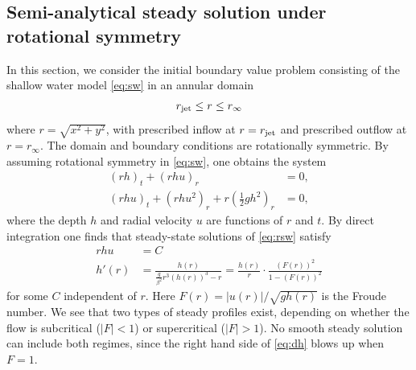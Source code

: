 \documentclass[preprint, 11pt]{article}
\begin{document}
\subsection{Semi-analytical steady solution under rotational symmetry}\label{sec:steady_chj}
In this section, we consider the initial boundary value problem consisting of the
shallow water model \eqref{eq:sw} in an annular domain
\begin{align} \label{eq:annulus}
r_\textup{jet} \le r \le r_\infty
\end{align}
where $r = \sqrt{x^2+y^2}$, with prescribed inflow at $r=r_\textup{jet}$
and prescribed outflow at $r=r_\infty$.
The domain and boundary conditions are rotationally symmetric.
By assuming rotational symmetry in \eqref{eq:sw}, one obtains the system
\begin{subequations} \label{eq:rsw}
\begin{align}
    (rh)_t + (rhu)_r &= 0, \label{mass1} \\
    (rhu)_t + (rhu^2)_r + r \left(\frac{1}{2}gh^2\right)_r &= 0, \label{mom1}
\end{align}
\end{subequations}
where the depth $h$ and radial velocity $u$ are functions of $r$ and $t$.
By direct integration one finds that steady-state solutions of
\eqref{eq:rsw} satisfy
\begin{subequations}\label{steady}
\begin{align}
    rhu & = C \\
    h'(r) & = \frac{h(r)}{\frac{g}{\beta^2} r^3 (h(r))^3 -r} = \frac{h(r)}{r} \cdot \frac{(F(r))^2}{1-(F(r))^2} \label{eq:dh}
\end{align}
\end{subequations}
for some $C$ independent of $r$.  Here $F(r)=|u(r)|/\sqrt{gh(r)}$ is the Froude number.
We see that two types of steady profiles exist, depending on whether the flow
is subcritical ($|F|<1$) or supercritical ($|F|>1$).  No smooth steady solution can
include both regimes, since the right hand side of \eqref{eq:dh} blows up when $F=1$.
\end{document}
